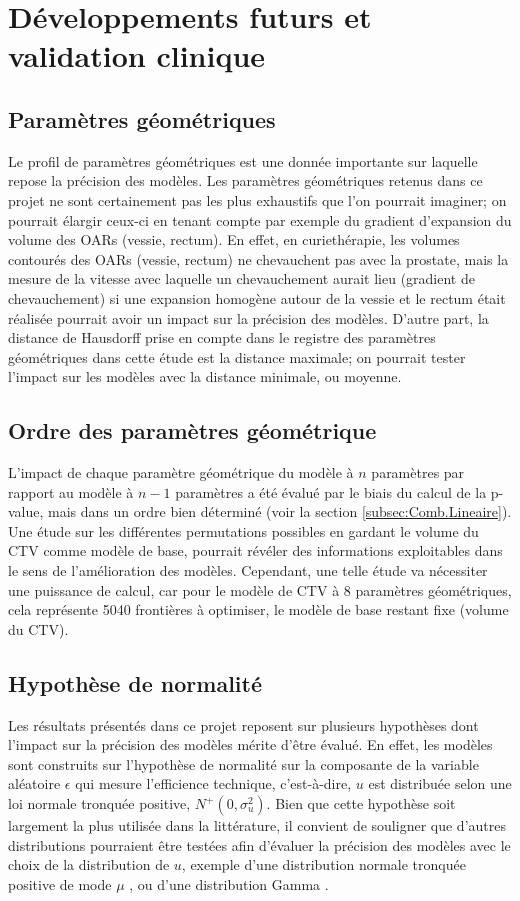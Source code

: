 \section{Développements futurs et validation clinique} \label{developementsfuturs}
\subsection{Paramètres géométriques}
Le profil de paramètres géométriques est une donnée importante sur laquelle repose la précision des modèles. Les paramètres géométriques retenus dans ce projet ne sont certainement pas les plus exhaustifs que l’on pourrait imaginer; on pourrait élargir ceux-ci en tenant compte par exemple du gradient d’expansion du volume des OARs (vessie, rectum). En effet, en curiethérapie, les volumes contourés des OARs (vessie, rectum) ne chevauchent pas avec la prostate, mais la mesure de la vitesse avec laquelle un chevauchement aurait lieu (gradient de chevauchement) si une expansion homogène autour de la vessie et le rectum était réalisée pourrait avoir un impact sur la précision des modèles. D’autre part, la distance de Hausdorff prise en compte dans le registre des paramètres géométriques dans cette étude est la distance maximale; on pourrait tester l’impact sur les modèles avec la distance minimale, ou moyenne.
%
\subsection{Ordre des paramètres géométrique}
L’impact de chaque paramètre géométrique du modèle à $n$ paramètres par rapport au modèle à $n-1$ paramètres a été évalué par le biais du calcul de la p-value, mais dans un ordre bien déterminé (voir la section \ref{subsec:Comb.Lineaire}). Une étude sur les différentes permutations possibles en gardant le volume du CTV comme modèle de base, pourrait révéler des informations exploitables dans le sens de l’amélioration des modèles. Cependant, une telle étude va nécessiter une puissance de calcul, car pour le modèle de CTV à 8 paramètres géométriques, cela représente 5040 frontières à optimiser, le modèle de base restant fixe (volume du CTV). 
%
\subsection{\texorpdfstring{Hypothèse de normalité} {Hypothèse de normalité sur u}}
Les résultats présentés dans ce projet reposent sur plusieurs hypothèses dont l’impact sur la précision des modèles mérite d’être évalué. En effet, les modèles sont construits sur l’hypothèse de normalité sur la composante de la variable aléatoire $\epsilon$ qui mesure l’efficience technique, c’est-à-dire, $u$ est distribuée selon une loi normale tronquée positive, $N^{+}(0, \sigma^{2}_{u})$. Bien que cette hypothèse soit largement la plus utilisée dans la littérature, il convient de souligner que d’autres distributions pourraient être testées afin d’évaluer la précision des modèles avec le choix de la distribution de $u$, exemple d’une distribution normale tronquée positive de mode $\mu$ \cite{Stevenson@1980}, ou d'une distribution Gamma \cite{ Greene@1990}. 
%
